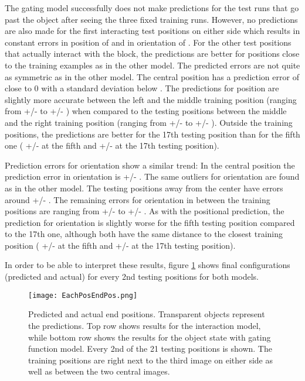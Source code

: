 The gating model successfully does not make predictions for the test runs that go past the object after seeing the three fixed training runs. However, no predictions are also made for the first interacting test positions on either side which results in constant errors in position of  and in orientation of .
For the other test positions that actually interact with the block, the predictions are better for positions close to the training examples as in the other model.
The predicted errors are not quite as symmetric as in the other model.
The central position has a prediction error of close to 0 with a standard deviation below . 
The predictions for position are slightly more accurate between the left and the middle training position (ranging from  +/-  to  +/- ) when compared to the testing positions between the middle and the right training position (ranging from  +/-  to  +/- ). Outside the training positions, the predictions are better for the 17th testing position than for the fifth one ( +/-  at the fifth and  +/-  at the 17th testing position).

Prediction errors for orientation show a similar trend: 
In the central position the prediction error in orientation is  +/- .
The same outliers for orientation are found as in the other model. The testing positions  away from the center have errors around  +/- .
The remaining errors for orientation in between the training positions are ranging from  +/-  to  +/- .
As with the positional prediction, the prediction for orientation is slightly worse for the fifth testing position compared to the 17th one, although both have the same distance to the closest training position ( +/-  at the fifth and  +/-  at the 17th testing position).

In order to be able to interpret these results, figure \ref{fig:EachPosEndPos} shows final configurations (predicted and actual) for every 2nd testing positions for both models.

\begin{figure}
\centering
\texttt{[image: EachPosEndPos.png]}
\caption{Predicted and actual end positions. Transparent objects represent the predictions. Top row shows results for the interaction model, while bottom row shows the results for the object state with gating function model. Every 2nd of the 21 testing positions is shown. The training positions are right next to the third image on either side as well as between the two central images.}
\label{fig:EachPosEndPos}
\end{figure}

